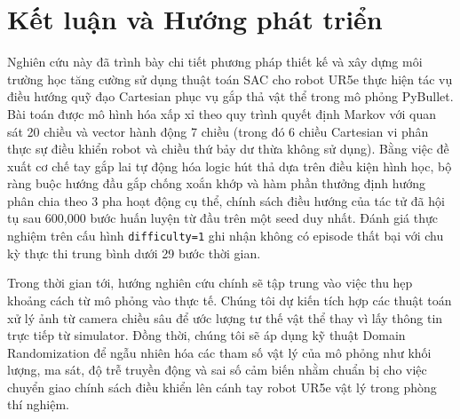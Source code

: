 \documentclass[conference]{IEEEtran}
\begin{document}
\section{Kết luận và Hướng phát triển}
Nghiên cứu này đã trình bày chi tiết phương pháp thiết kế và xây dựng môi trường học tăng cường sử dụng thuật toán SAC cho robot UR5e thực hiện tác vụ điều hướng quỹ đạo Cartesian phục vụ gắp thả vật thể trong mô phỏng PyBullet. Bài toán được mô hình hóa xấp xỉ theo quy trình quyết định Markov với quan sát 20 chiều và vector hành động 7 chiều (trong đó 6 chiều Cartesian vi phân thực sự điều khiển robot và chiều thứ bảy dư thừa không sử dụng). Bằng việc đề xuất cơ chế tay gắp lai tự động hóa logic hút thả dựa trên điều kiện hình học, bộ ràng buộc hướng đầu gắp chống xoắn khớp và hàm phần thưởng định hướng phân chia theo 3 pha hoạt động cụ thể, chính sách điều hướng của tác tử đã hội tụ sau 600,000 bước huấn luyện từ đầu trên một seed duy nhất. Đánh giá thực nghiệm trên cấu hình \texttt{difficulty=1} ghi nhận không có episode thất bại với chu kỳ thực thi trung bình dưới 29 bước thời gian.

Trong thời gian tới, hướng nghiên cứu chính sẽ tập trung vào việc thu hẹp khoảng cách từ mô phỏng vào thực tế. Chúng tôi dự kiến tích hợp các thuật toán xử lý ảnh từ camera chiều sâu để ước lượng tư thế vật thể thay vì lấy thông tin trực tiếp từ simulator. Đồng thời, chúng tôi sẽ áp dụng kỹ thuật Domain Randomization để ngẫu nhiên hóa các tham số vật lý của mô phỏng như khối lượng, ma sát, độ trễ truyền động và sai số cảm biến nhằm chuẩn bị cho việc chuyển giao chính sách điều khiển lên cánh tay robot UR5e vật lý trong phòng thí nghiệm.

\begingroup
\sloppy


\endgroup
\end{document}
